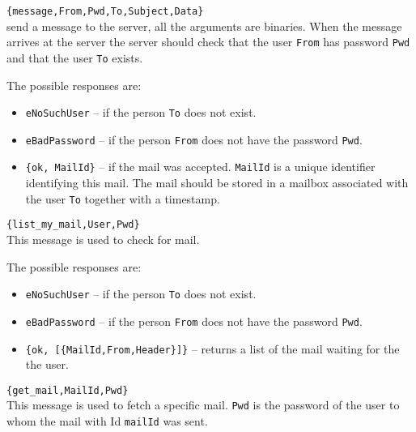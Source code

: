\documentclass[12pt]{hitec}
\begin{document}
\begin{description}

\item \verb+{message,From,Pwd,To,Subject,Data}+\\
  send a message to
  the server, all the arguments are binaries. When the message arrives
  at the server the server should check that the user \verb+From+ has
  password \verb+Pwd+ and that the user \verb+To+ exists. 

  The possible responses are:
  
  \begin{itemize}
  
  \item \verb+eNoSuchUser+ -- if the person \verb+To+ does not exist.
  
  \item \verb+eBadPassword+  -- if the person \verb+From+ does not have the
  password \verb+Pwd+.
  
\item \verb+{ok, MailId}+ -- if the mail was accepted. \verb+MailId+ is
  a unique identifier identifying this mail.
  The mail should be stored in a mailbox 
  associated with the user \verb+To+ together with a timestamp.
 

 \end{itemize}
  
 
\item \verb+{list_my_mail,User,Pwd}+\\
  This message is used to check for mail. 

  The possible responses are:
  
  \begin{itemize}
  
  \item \verb+eNoSuchUser+ -- if the person \verb+To+ does not exist.
  
  \item \verb+eBadPassword+  -- if the person \verb+From+ does not have the
  password \verb+Pwd+.
  
\item \verb+{ok, [{MailId,From,Header}]}+ -- returns a list of the mail
  waiting for the the user.
  \end{itemize}

 
\item \verb+{get_mail,MailId,Pwd}+\\
  This message is used to fetch a specific mail. \verb+Pwd+ is  
  the password of the user to whom the mail with Id \verb+mailId+ was sent.


\end{description}
\end{document}
